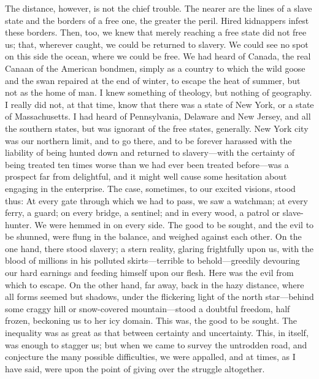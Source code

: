 The distance, however, is not the chief trouble. The nearer are the
lines of a slave state and the borders of a free one, the greater the
peril. Hired kidnappers infest these borders. Then, too, we knew that
merely reaching a free state did not free us; that, wherever caught, we
could be returned to slavery. We could see no spot on this side the
ocean, where we could be free. We had heard of Canada, the real Canaan
of the American bondmen, simply as a country to which the wild goose and
the swan repaired at {\protect\hypertarget{282}{}{}}the end of winter,
to escape the heat of summer, but not as the home of man. I knew
something of theology, but nothing of geography. I really did not, at
that time, know that there was a state of New York, or a state of
Massachusetts. I had heard of Pennsylvania, Delaware and New Jersey, and
all the southern states, but was ignorant of the free states, generally.
New York city was our northern limit, and to go there, and to be forever
harassed with the liability of being hunted down and returned to
slavery---with the certainty of being treated ten times worse than we
had ever been treated before---was a prospect far from delightful, and
it might well cause some hesitation about engaging in the enterprise.
The case, sometimes, to our excited visions, stood thus: At every gate
through which we had to pass, we saw a watchman; at every ferry, a
guard; on every bridge, a sentinel; and in every wood, a patrol or
slave-hunter. We were hemmed in on every side. The good to be sought,
and the evil to be shunned, were flung in the balance, and weighed
against each other. On the one hand, there stood slavery; a stern
reality, glaring frightfully upon us, with the blood of millions in his
polluted skirts---terrible to behold---greedily devouring our hard
earnings and feeding himself upon our flesh. Here was the evil from
which to escape. On the other hand, far away, back in the hazy distance,
where all forms seemed but shadows, under the flickering light of the
north star---behind some craggy hill or snow-covered mountain---stood a
doubtful freedom, half frozen, beckoning us to her icy domain. This was,
the good to be sought. The inequality was as
{\protect\hypertarget{283}{}{}}great as that between certainty and
uncertainty. This, in itself, was enough to stagger us; but when we came
to survey the untrodden road, and conjecture the many possible
difficulties, we were appalled, and at times, as I have said, were upon
the point of giving over the struggle altogether.

